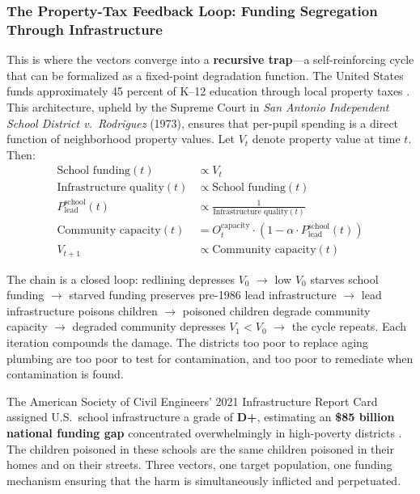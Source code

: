 \subsubsection{The Property-Tax Feedback Loop: Funding Segregation Through Infrastructure}

This is where the vectors converge into a \textbf{recursive trap}---a self-reinforcing cycle that can be formalized as a fixed-point degradation function. The United States funds approximately 45 percent of K--12 education through local property taxes \cite{tel_nces}. This architecture, upheld by the Supreme Court in \textit{San Antonio Independent School District v.\ Rodriguez} (1973), ensures that per-pupil spending is a direct function of neighborhood property values. Let $V_t$ denote property value at time $t$. Then:
\begin{align}
\text{School funding}(t) &\propto V_t \label{eq:9.5-school-funding-property-value}\\[4pt]
\text{Infrastructure quality}(t) &\propto \text{School funding}(t) \label{eq:9.6-infrastructure-quality-funding}\\[4pt]
P_{\text{lead}}^{\text{school}}(t) &\propto \frac{1}{\text{Infrastructure quality}(t)} \label{eq:9.7-school-lead-exposure-inverse}\\[4pt]
\text{Community capacity}(t) &= O_t^{\text{capacity}} \cdot (1 - \alpha \cdot P_{\text{lead}}^{\text{school}}(t)) \label{eq:9.8-community-capacity-lead-reduction}\\[4pt]
V_{t+1} &\propto \text{Community capacity}(t) \label{eq:9.9-property-value-capacity-feedback}
\end{align}

The chain is a closed loop: redlining depresses $V_0$ $\rightarrow$ low $V_0$ starves school funding $\rightarrow$ starved funding preserves pre-1986 lead infrastructure $\rightarrow$ lead infrastructure poisons children $\rightarrow$ poisoned children degrade community capacity $\rightarrow$ degraded community depresses $V_1 < V_0$ $\rightarrow$ the cycle repeats. Each iteration compounds the damage. The districts too poor to replace aging plumbing are too poor to test for contamination, and too poor to remediate when contamination is found.

The American Society of Civil Engineers' 2021 Infrastructure Report Card assigned U.S.\ school infrastructure a grade of \textbf{D+}, estimating an \textbf{\$85 billion national funding gap} concentrated overwhelmingly in high-poverty districts \cite{tel_asce}. The children poisoned in these schools are the same children poisoned in their homes and on their streets. Three vectors, one target population, one funding mechanism ensuring that the harm is simultaneously inflicted and perpetuated.

